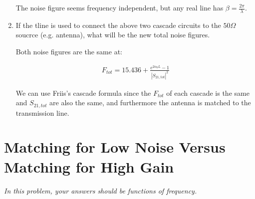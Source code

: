 \begin{enumerate}[label=(\alph*)]
    The noise figure seems frequency independent, but any real line has $\beta = \frac{2\pi}{\lambda}$.

    \item {\color{blue} If the tline is used to connect the above two cascade circuits to the $50\Omega$ soucrce (e.g. antenna), what will be the new total noise figures.}

    Both noise figures are the same at:

    \begin{align*}
        F_{tot} = 15.436 + \frac{e^{2 \alpha_0 L} - 1}{|S_{21,tot}|^2}
    \end{align*}

    We can use Friis's cascade formula since the $F_{tot}$ of each cascade is the same and $S_{21,tot}$ are also the same, and furthermore the antenna is matched to the transmission line.
\end{enumerate}

\section{Matching for Low Noise Versus Matching for High Gain}
\emph{In this problem, your answers should be functions of frequency.}

